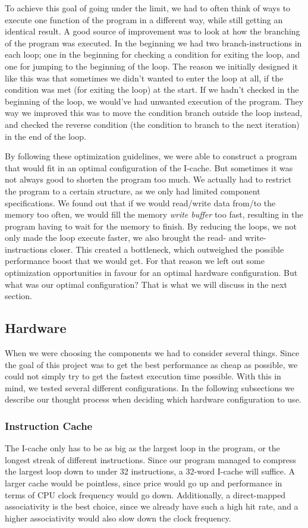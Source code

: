 \documentclass[a4paper,9pt,fleqn]{article}
\begin{document}
To achieve this goal of going under the limit, we had to often think of ways to execute one function of the
program in a different way, while still getting an identical result. A good source of improvement was to 
look at how the branching of the program was executed. In the beginning we had two branch-instructions
in each loop; one in the beginning for checking a condition for exiting the loop, and one for jumping to the 
beginning of the loop. The reason we initially designed it like this was that sometimes we didn't wanted to 
enter the loop at all, if the condition was met (for exiting the loop) at the start. If we hadn't checked in the 
beginning of the loop, we would've had unwanted execution of the program. They way we improved this 
was to move the condition branch outside the loop instead, and checked the reverse condition (the 
condition to branch to the next iteration) in the end of the loop.

By following these optimization guidelines, we were able to construct a program that would fit in an 
optimal configuration of the I-cache. But sometimes it was not always good to shorten the program too 
much. We actually had to restrict the program to a certain structure, as we only had limited component 
specifications. We found out that if we would read/write data from/to the memory too often, we would fill 
the memory {\it write buffer} too fast, resulting in the program having to wait for the memory to finish. By 
reducing the loops, we not only made the loop execute faster, we also brought the read- and write-
instructions closer. This created a bottleneck, which outweighed the possible performance boost that we 
would get. For that reason we left out some optimization opportunities in favour for an optimal hardware 
configuration. But what was our optimal configuration? That is what we will discuss in the next section.

\subsection{Hardware}
When we were choosing the components we had to consider several things. Since the goal of this project 
was to get the best performance as cheap as possible, we could not simply try to get the fastest execution 
time possible. With this in mind, we tested several different configurations. In the following subsections we 
describe our thought process when deciding which hardware configuration to use.

\subsubsection{Instruction Cache}
The I-cache only has to be as big as the largest loop in the program, or the longest streak of different 
instructions. Since our program managed to compress the largest loop down to under 32 instructions, a 
32-word I-cache will suffice. A larger cache would be pointless, since price would go up and performance 
in terms of CPU clock frequency would go down. Additionally, a direct-mapped associativity is the best 
choice, since we already have such a high hit rate, and a higher associativity would also slow down the 
clock frequency.
\end{document}
